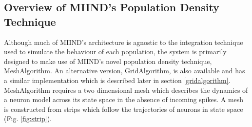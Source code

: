 \documentclass[utf8]{frontiersSCNS} %
\begin{document}
\subsection{Overview of MIIND’s Population Density Technique}
\label{miindoverview}
Although much of MIIND’s architecture is agnostic to the integration technique used to simulate the behaviour of each population, the system is primarily designed to make use of MIIND’s novel population density technique, MeshAlgorithm. An alternative version, GridAlgorithm, is also available and has a similar implementation which is described later in section \ref{gridalgorithm}. MeshAlgorithm requires a two dimensional mesh which describes the dynamics of a neuron model across its state space in the absence of incoming spikes. A mesh is constructed from strips which follow the trajectories of neurons in state space (Fig. \ref{fig:strip}). 
\end{document}
